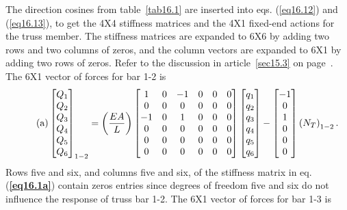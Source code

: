 \documentclass{AeroStructure-ERJohnson}
\begin{document}
\begin{example}
\noindent The direction cosines from table~\ref{tab16.1} are inserted into eqs. (\ref{eq16.12}) and (\ref{eq16.13}), to get the 4X4 stiffness matrices and the 4X1 fixed-end actions for the truss member. The stiffness matrices are expanded to 6X6 by adding two rows and two columns of zeros, and the column vectors are expanded to 6X1 by adding two rows of zeros. Refer to the discussion in article~\ref{sec15.3} on page~\pageref{sec15.3}. The 6X1 vector of forces for bar 1-2 is
\begin{align}\label{eq16.1a}\tag{a}
\left[\begin{array}{@{}l@{}}Q_{1} \\Q_{2} \\Q_{3} \\Q_{4} \\Q_{5} \\Q_{6}\end{array}\right]_{1-2}=\left(\frac{EA}{L}\right)\left[\begin{array}{@{}cccccc@{}}1 & 0 & -1 & 0 & 0 & 0 \\0 & 0 & 0 & 0 & 0 & 0 \\-1 & 0 & 1 & 0 & 0 & 0 \\0 & 0 & 0 & 0 & 0 & 0 \\0 & 0 & 0 & 0 & 0 & 0 \\0 & 0 & 0 & 0 & 0 & 0\end{array}\right]\left[\begin{array}{@{}l@{}}q_{1} \\q_{2} \\q_{3} \\q_{4} \\q_{5} \\q_{6}\end{array}\right]-\left[\begin{array}{@{}c@{}}-1 \\0 \\1 \\0 \\0 \\0\end{array}\right]\left(N_{T}\right)_{1-2}.
\end{align}
Rows five and six, and columns five and six, of the stiffness matrix in eq. (\textbf{\ref{eq16.1a}}) contain zeros entries since degrees of freedom five and six do not influence the response of truss bar 1-2. The 6X1 vector of forces for bar 1-3 is
\begin{align}\label{eq16.1b}\tag{b}

\end{align}
\end{example}
\end{document}
